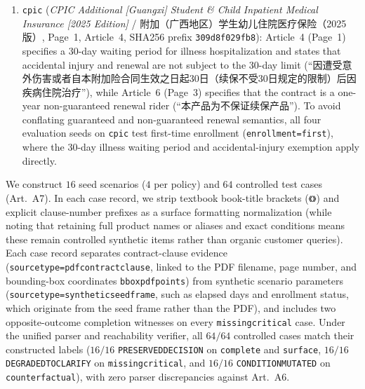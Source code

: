 \documentclass[10pt,twocolumn]{article}
\renewcommand{\_}{\textunderscore\allowbreak}
\begin{document}
\begin{enumerate}[leftmargin=*,nosep]
  \item \texttt{cpic\_93896} (\emph{CPIC Additional [Guangxi] Student \& Child Inpatient Medical Insurance [2025 Edition]} / 附加（广西地区）学生幼儿住院医疗保险（2025版）, Page~1, Article~4, SHA256 prefix \texttt{309d8f029fb8}): Article~4 (Page~1) specifies a 30-day waiting period for illness hospitalization and states that accidental injury and renewal are not subject to the 30-day limit (``因遭受意外伤害或者自本附加险合同生效之日起30日（续保不受30日规定的限制）后因疾病住院治疗''), while Article~6 (Page~3) specifies that the contract is a one-year non-guaranteed renewal rider (``本产品为不保证续保产品''). To avoid conflating guaranteed and non-guaranteed renewal semantics, all four evaluation seeds on \texttt{cpic\_93896} test first-time enrollment (\texttt{enrollment=first}), where the 30-day illness waiting period and accidental-injury exemption apply directly.
\end{enumerate}

We construct $16$ seed scenarios ($4$ per policy) and $64$ controlled test cases (Art.~A7). In each case record, we strip textbook book-title brackets (\texttt{《》}) and explicit clause-number prefixes as a surface formatting normalization (while noting that retaining full product names or aliases and exact conditions means these remain controlled synthetic items rather than organic customer queries). Each case record separates contract-clause evidence (\texttt{source\_type=pdf\_contract\_clause}, linked to the PDF filename, page number, and bounding-box coordinates \texttt{bbox\_pdf\_points}) from synthetic scenario parameters (\texttt{source\_type=synthetic\_seed\_frame}, such as elapsed days and enrollment status, which originate from the seed frame rather than the PDF), and includes two opposite-outcome completion witnesses on every \texttt{missing\_critical} case. Under the unified parser and reachability verifier, all $64/64$ controlled cases match their constructed labels ($16/16$ \texttt{PRESERVED\_DECISION} on \texttt{complete} and \texttt{surface}, $16/16$ \texttt{DEGRADED\_TO\_CLARIFY} on \texttt{missing\_critical}, and $16/16$ \texttt{CONDITION\_MUTATED} on \texttt{counterfactual}), with zero parser discrepancies against Art.~A6.
\end{document}
